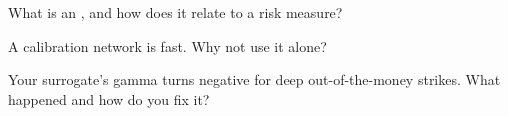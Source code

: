 \begin{interviewq}\label{iq:ml:deep-hedging-and-machine-learning-in-pricing:4}
What is an , and how does it relate to a risk measure?
\end{interviewq}

\begin{interviewq}\label{iq:ml:deep-hedging-and-machine-learning-in-pricing:5}
A calibration network is fast. Why not use it alone?
\end{interviewq}

\begin{interviewq}\label{iq:ml:deep-hedging-and-machine-learning-in-pricing:6}
Your surrogate's gamma turns negative for deep out-of-the-money strikes. What happened and how do you fix it?
\end{interviewq}

